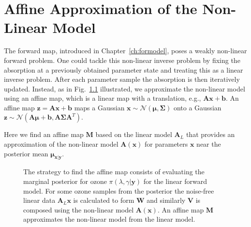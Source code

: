 \chapter{Affine Approximation of the Non-Linear Model}
\label{ch:affine}

\newcommand*{\vertbar}{\rule[-1ex]{0.5pt}{2.5ex}}
\newcommand*{\horzbar}{\rule[.5ex]{2.5ex}{0.5pt}}
The forward map, introduced in Chapter~\ref{ch:formodel}, poses a weakly non-linear forward problem.
One could tackle this non-linear inverse problem by fixing the absorption at a previously obtained parameter state and treating this as a linear inverse problem.
After each parameter sample the absorption is then iteratively updated.
Instead, as in Fig.~\ref{fig:affinStrat} illustrated, we approximate the non-linear model using an affine map, which is a linear map with a translation, e.g., $\bm{A}\bm{x} + \bm{b}$.
An affine map $ \bm{z} = \bm{A}\bm{x} + \bm{b}$ maps a Gaussian $\bm{x} \sim \mathcal{N}(\bm{\mu}, \bm{\Sigma})$ onto a Gaussian $\bm{z} \sim \mathcal{N}(\bm{A}\bm{\mu} + \bm{b}, \bm{A}\bm{\Sigma}\bm{A}^T)$.

Here we find an affine map $\bm{M}$ based on the linear model $\bm{A}_L$ that provides an approximation of the non-linear model $\bm{A}(\bm{x})$ for parameters $\bm{x}$ near the posterior mean $\bm{\mu}_{\bm{x}|\bm{y}}$.
\begin{figure}[htb!]
	\centering
	\caption[Strategy to find affine map.]{The strategy to find the affine map consists of evaluating the marginal posterior for ozone $\pi(\lambda , \gamma  | \bm{y})$ for the linear forward model. For some ozone samples from the posterior the noise-free linear data $\bm{A}_L \bm{x}$ is calculated to form $\bm{W}$ and similarly $\bm{V}$ is composed using the non-linear model $\bm{A}(\bm{x})$. An affine map $\bm{M}$ approximates the non-linear model from the linear model.}
	\label{fig:affinStrat}
\end{figure}

